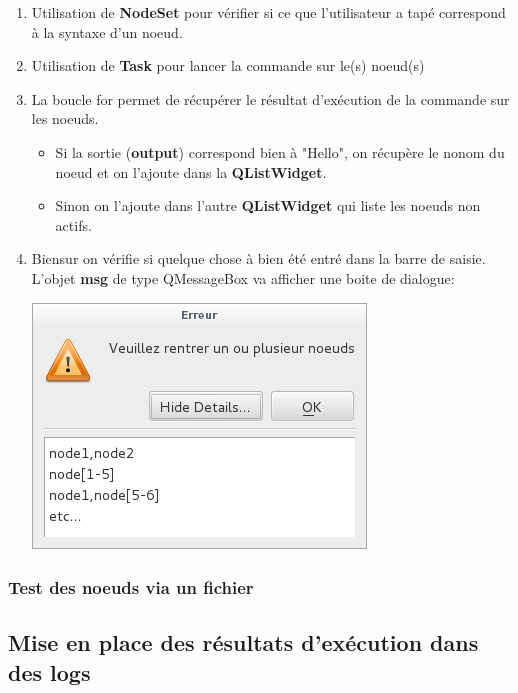 \documentclass[a4paper,11pt]{article}
\begin{document}
\begin{enumerate}
\item Utilisation de \textbf{NodeSet} pour vérifier si ce que l'utilisateur a tapé correspond à la syntaxe d'un noeud.
\item Utilisation de \textbf{Task} pour lancer la commande sur le(s) noeud(s)
\item La boucle for permet de récupérer le résultat d'exécution de la commande sur les noeuds.
\begin{itemize}
\item Si la sortie (\textbf{output}) correspond bien à "Hello", on récupère le nonom du noeud et on l'ajoute dans la \textbf{QListWidget}.
\item Sinon on l'ajoute dans l'autre \textbf{QListWidget} qui liste les noeuds non actifs.
\end{itemize}
\item Biensur on vérifie si quelque chose à bien été entré dans la barre de saisie. L'objet \textbf{msg} de type QMessageBox va afficher une boite de dialogue:\\
\linebreak
\begin{center}
\includegraphics[scale=0.8]{messagebox.png} 
\end{center}

\end{enumerate}
 




\subsubsection{Test des noeuds via un fichier}

\subsection{Mise en place des résultats d'exécution dans des logs}
\end{document}
